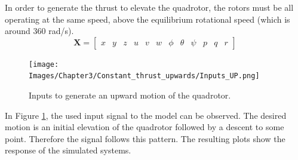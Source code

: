 In order to generate the thrust to elevate the quadrotor, the rotors must be all operating at the same speed, above the equilibrium rotational speed (which is around 360 rad/s). 
\begin{equation} \label{eq:statevector}
\mathbf{X} = \begin{bmatrix} x & y & z & u & v & w & \phi & \theta & \psi & p & q & r \end{bmatrix}
\end{equation} 
\begin{figure}[h!]
\centering
\texttt{[image: Images/Chapter3/Constant\_thrust\_upwards/Inputs\_UP.png]}
\caption{Inputs to generate an upward motion of the quadrotor.}
\label{fig:upwards_inputs}
\end{figure}

In Figure \ref{fig:upwards_inputs}, the used input signal to the model can be observed. The desired motion is an initial elevation of the quadrotor followed by a descent to some point. Therefore the signal follows this pattern. The resulting plots show the response of the simulated systems. \\

